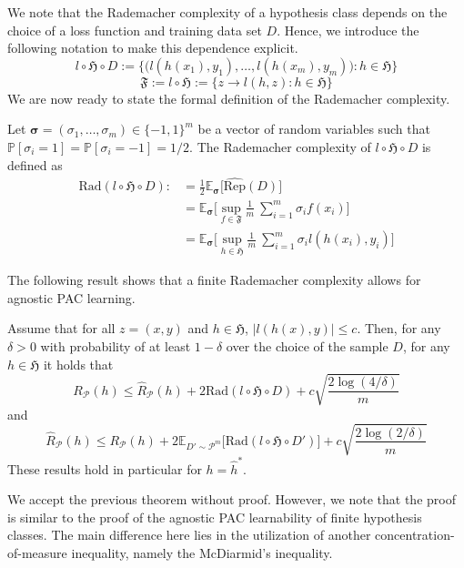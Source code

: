 We note that the Rademacher complexity of a hypothesis class depends on the
choice of a loss function and training data set $D$. Hence, we introduce the
following notation to make this dependence explicit.
$$l \circ \mathfrak{H} \circ D := \{\bigl(l(h(x_1), y_1), \dots, l(h(x_m), y_m)\bigr) : h \in
\mathfrak{H}\}$$
$$
\mathfrak{F} := l \circ \mathfrak{H} := \{ z \to l(h,z): h \in \mathfrak{H}\}
$$
We are now ready to state the formal definition of the Rademacher complexity.
\begin{definition}
Let $\mathbf{\sigma} = (\sigma_1, \dots, \sigma_m) \in \{-1,1\}^m$ be a vector
of random variables such that $\mathbb{P} [\sigma_i = 1] = \mathbb{P} [\sigma_i=-1]
= 1/2$. The Rademacher complexity of $l\circ \mathfrak{H} \circ D$ is defined as
\begin{align*}
\text{Rad}(l \circ \mathfrak{H} \circ D) :&= \frac{1}{2} \mathbb{E}_{\mathbf{\sigma}} \bigl[ \hat{\text{Rep}}(D) \bigr] \\
&=\mathbb{E}_{\mathbf{\sigma}} \bigl[ \sup_{f \in \mathfrak{F}} \frac{1}{m} \ \sum_{i=1}^{m} \sigma_i f(x_i) \bigr] \\
&= \mathbb{E}_{\mathbf{\sigma}} \bigl[ \sup_{h \in \mathfrak{H}} \frac{1}{m} \ \sum_{i=1}^{m} \sigma_i l(h(x_i), y_i) \bigr]
\end{align*} 
\end{definition}
The following result shows that a finite Rademacher complexity allows for agnostic PAC learning.
\begin{thm}
	Assume that for all $z=(x,y)$ and $h \in \mathfrak{H}$, $|l(h(x),y)| \leq c$.
	Then, for any $\delta > 0$ with probability of at least $1-\delta$ over
	the choice of the sample $D$, for any $h \in \mathfrak{H}$ it holds that
	\begin{equation}
		\label{eq:ERM_principle}
		R_{\mathcal{P}}(h) \leq \hat{R}_{\mathcal{P}}(h) + 2 \text{Rad}(l \circ \mathfrak{H} \circ D) + c \sqrt{\frac{2 \log(4/\delta)}{m}}		
	\end{equation}
	and 
	$$
	\hat{R}_{\mathcal{P}}(h) \leq R_{\mathcal{P}}(h) + 2 \mathbb{E}_{D' \sim \mathcal{P}^m} \bigl[ \text{Rad}(l \circ \mathfrak{H} \circ D') \bigr] + c \sqrt{\frac{2 \log(2/\delta)}{m}}
	$$
	These results hold in particular for $h=\hat{h}^*$.
\end{thm}
We accept the previous theorem without proof. However, we note that the proof is
similar to the proof of the agnostic PAC learnability of finite hypothesis
classes. The main difference here lies in the utilization of another
concentration-of-measure inequality, namely the McDiarmid's inequality.
